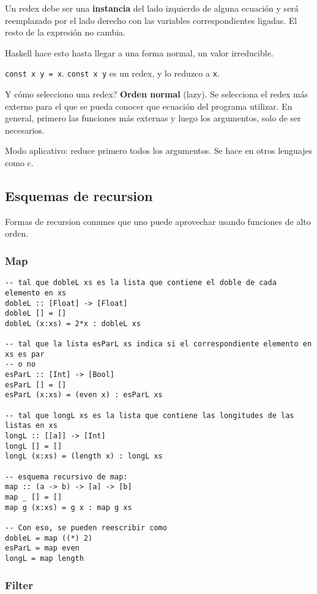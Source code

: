\documentclass{report}
\theoremstyle{definition} %
\begin{document}
Un redex debe ser una \textbf{instancia} del lado izquierdo de alguna ecuación y
será reemplazado por el lado derecho con las variables correspondientes ligadas.
El resto de la expresión no cambia.

Haskell hace esto hasta llegar a una forma normal, un valor irreducible.

\texttt{const x y = x}. \texttt{const x y} es un redex, y lo reduzco a
\texttt{x}.

Y cómo selecciono una redex? \textbf{Orden normal} (lazy). Se selecciona el
redex más externo para el que se pueda conocer que ecuación del programa
utilizar. En general, primero las funciones más externas y luego los argumentos,
solo de ser necesarios.

Modo aplicativo: reduce primero todos los argumentos. Se hace en otros lenguajes
como c.

\subsection{Esquemas de recursion}

Formas de recursion comunes que uno puede aprovechar usando funciones de alto
orden.

\subsubsection{Map}

\begin{verbatim}
-- tal que dobleL xs es la lista que contiene el doble de cada elemento en xs
dobleL :: [Float] -> [Float]
dobleL [] = []
dobleL (x:xs) = 2*x : dobleL xs

-- tal que la lista esParL xs indica si el correspondiente elemento en xs es par
-- o no
esParL :: [Int] -> [Bool] 
esParL [] = []
esParL (x:xs) = (even x) : esParL xs

-- tal que longL xs es la lista que contiene las longitudes de las listas en xs
longL :: [[a]] -> [Int]
longL [] = []
longL (x:xs) = (length x) : longL xs

-- esquema recursivo de map:
map :: (a -> b) -> [a] -> [b]
map _ [] = []
map g (x:xs) = g x : map g xs

-- Con eso, se pueden reescribir como
dobleL = map ((*) 2)
esParL = map even
longL = map length
\end{verbatim}

\subsubsection{Filter}
\end{document}

